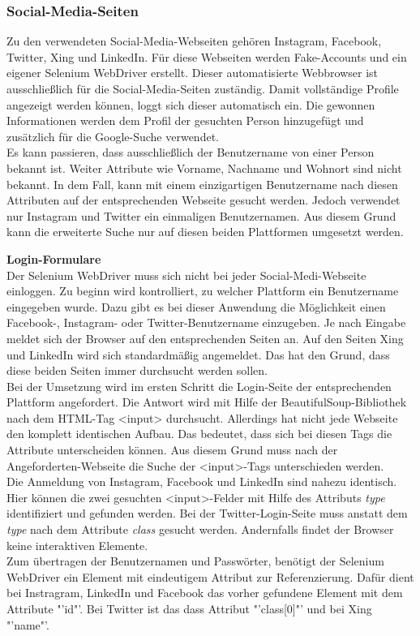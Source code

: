 			\subsubsection{Social-Media-Seiten}
			\label{subsubsec:SocialMediaSeiten}
			Zu den verwendeten Social-Media-Webseiten gehören Instagram, Facebook, Twitter, Xing und LinkedIn. Für diese Webseiten werden Fake-Accounts und ein eigener Selenium WebDriver erstellt. Dieser automatisierte Webbrowser ist ausschließlich für die Social-Media-Seiten zuständig. Damit vollständige Profile angezeigt werden können, loggt sich dieser automatisch ein. Die gewonnen Informationen werden dem Profil der gesuchten Person hinzugefügt und zusätzlich für die Google-Suche verwendet.\\
			Es kann passieren, dass ausschließlich der Benutzername von einer Person bekannt ist. Weiter Attribute wie Vorname, Nachname und Wohnort sind nicht bekannt. In dem Fall, kann mit einem einzigartigen Benutzername nach diesen Attributen auf der entsprechenden Webseite gesucht werden. Jedoch verwendet nur Instagram und Twitter ein einmaligen Benutzernamen. Aus diesem Grund kann die erweiterte Suche nur auf diesen beiden Plattformen umgesetzt werden.
			
			\textbf{Login-Formulare}\\
			Der Selenium WebDriver muss sich nicht bei jeder Social-Medi-Webseite einloggen. Zu beginn wird kontrolliert, zu welcher Plattform ein Benutzername eingegeben wurde. Dazu gibt es bei dieser Anwendung die Möglichkeit einen Facebook-, Instagram- oder Twitter-Benutzername einzugeben. Je nach Eingabe meldet sich der Browser auf den entsprechenden Seiten an. Auf den Seiten Xing und LinkedIn wird sich standardmäßig  angemeldet. Das hat den Grund, dass diese beiden Seiten immer durchsucht werden sollen. \\
			Bei der Umsetzung wird im ersten Schritt die Login-Seite der entsprechenden Plattform angefordert. Die Antwort wird mit Hilfe der BeautifulSoup-Bibliothek nach dem HTML-Tag <input> durchsucht. Allerdings hat nicht jede Webseite den komplett identischen Aufbau. Das bedeutet, dass sich bei diesen Tags die Attribute unterscheiden können. Aus diesem Grund muss nach der Angeforderten-Webseite die Suche der <input>-Tags unterschieden werden.\\
			Die Anmeldung von Instagram, Facebook und LinkedIn sind nahezu identisch. Hier können die zwei gesuchten <input>-Felder mit Hilfe des Attributs \textit{type} identifiziert und gefunden werden. Bei der Twitter-Login-Seite muss anstatt dem \textit{type} nach dem Attribute \textit{class} gesucht werden. Andernfalls findet der Browser keine interaktiven Elemente.\\
			Zum übertragen der Benutzernamen und Passwörter, benötigt der Selenium WebDriver ein Element mit eindeutigem Attribut zur Referenzierung. Dafür dient bei Instragram, LinkedIn und Facebook das vorher gefundene Element mit dem Attribute "'id"'. Bei Twitter ist das dass Attribut "'class[0]"' und bei Xing "'name"'.
			 
